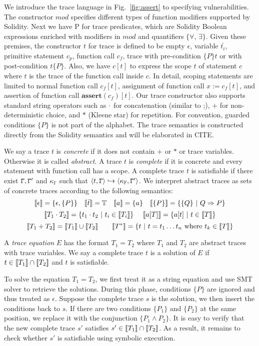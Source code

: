 We introduce the trace language in Fig.~\ref{fig:assert} to specifying vulnerabilities. The constructor $\textit{mod}$ specifies different types of function modifiers supported by Solidity. Next we have P for trace predicates, which are Solidity Boolean expressions enriched with modifiers in  $\textit{mod}$ and quantifiers $\{\forall$, $\exists\}$. Given these premises, the constructor $t$ for trace is defined to be empty $\epsilon$, variable $\bar{t_i}$, primitive statement $c_p$, function call $c_f$, trace with pre-condition $\{P\}t$ or with post-condition $t\{P\}$. Also, we have $c[t]$ to express the scope $t$ of statement $c$ where $t$ is the trace of the function call inside $c$. In detail, scoping statements are limited to normal function call $c_f[t]$, assignment of function call $x := c_f[t]$, and assertion of function call $\textbf{assert}(c_f)[t]$. Our trace constructor also supports standard string operators such as $\cdot$ for concatenation (similar to ;), $+$ for non-deterministic choice, and $*$ (Kleene star) for repetition. For convention, guarded conditions $\{P\}$ is not part of the alphabet. The trace semantics is constructed directly from the Solidity semantics and will be elaborated in CITE.

We say a trace $t$ is \emph{concrete} if it does not contain $+$ or $*$ or trace variables. Otherwise it is called \emph{abstract}. A trace $t$ is \emph{complete} if it is concrete and every statement with function call has a scope. A complete trace $t$ is satisfiable if there exist $\mathtt{\Gamma},\mathtt{\Gamma}'$ and $\kappa_\mathbb{F}$ such that $\langle t,\mathtt{\Gamma} \rangle \hookrightarrow \langle \kappa_{\mathbb{F}},\mathtt{\Gamma}' \rangle$. We interpret abstract traces as sets of concrete traces according to the following semantics:
$$
\llbracket \epsilon \rrbracket = \{\epsilon,\{P\}\}~~~\llbracket \bar{t} \rrbracket = \mathbb{T}~~~\llbracket a \rrbracket = \{a\}~~~
\llbracket \{P\} \rrbracket = \{\{Q\}~|~Q \Rightarrow P\}
$$
$$
\llbracket T_1 \cdot T_2 \rrbracket = \{t_1 \cdot t_2~|~t_i \in \llbracket T_i \rrbracket\}~~~~\llbracket a[T] \rrbracket = \{a[t]~|~t \in \llbracket T \rrbracket\}
$$
$$
\llbracket T_1 + T_2 \rrbracket = \llbracket T_1 \rrbracket \cup \llbracket T_2 \rrbracket
~~~~~~
\llbracket T^* \rrbracket = \{t~|~t = t_1 \ldots t_n \textrm{ where } t_k \in \llbracket T \rrbracket\}
$$

A \emph{trace equation} $E$ has the format $T_1 = T_2$ where $T_1$ and $T_2$ are abstract traces with trace variables. We say a complete trace $t$ is a solution of $E$ if $t \in \llbracket T_1 \rrbracket \cap \llbracket T_2 \rrbracket$ and $t$ is satisfiable.  

To solve the equation $T_1 = T_2$, we first treat it as a string equation and use SMT solver to retrieve the solutions. During this phase, conditions $\{P\}$ are ignored and thus treated as $\epsilon$. Suppose the complete trace $s$ is the solution, we then insert the conditions back to $s$. If there are two conditions $\{P_1\}$ and $\{P_2\}$ at the same position, we replace it with the conjunction $\{P_1 \wedge P_2\}$. It is easy to verify that the new complete trace $s'$ satisfies $s' \in \llbracket T_1 \rrbracket \cap \llbracket T_2 \rrbracket$. As a result, it remains to check whether $s'$ is satisfiable using symbolic execution.

